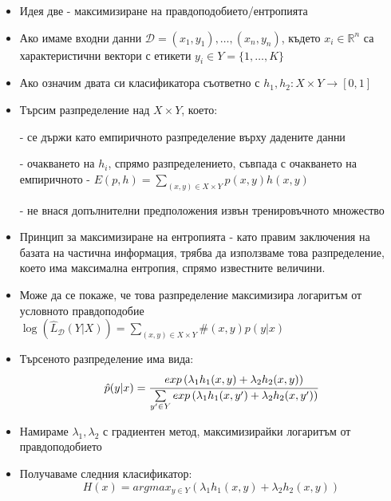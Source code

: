 \documentclass[9pt]{beamer}
\newcommand{\B}[1]{\left(#1\right)}
\begin{document}
    \begin{frame}[t]
        \begin{itemize}
            \setlength\itemsep{\fill}
            \item Идея две
            \pause - максимизиране на правдоподобието/ентропията
            \pause
            \item Ако имаме входни данни $\mathcal{D} = (x_1, y_1),\ldots,(x_n, y_n)$, където $x_i \in \mathbb{R}^n$ са характеристични вектори с етикети $y_i \in Y=\{1,\ldots, K\}$
            \pause
            \item Ако означим двата си класификатора съответно с $h_1, h_2: X\times Y \rightarrow [0, 1]$
            \pause
            \item Търсим разпределение над $X\times Y$, което:
            
            \pause - се държи като емпиричното разпределение върху дадените данни
            
            \pause - очакването на $h_i$, спрямо разпределението, съвпада с очакването на емпиричното
            \pause - $E(p, h) = \sum\limits_{(x, y) \in X\times Y} p(x, y)h(x, y)$

            \pause - не внася допълнителни предположения извън тренировъчното множество
            \pause
            \item Принцип за максимизиране на ентропията
            \pause - като правим заключения на базата на частична информация, трябва да използваме това разпределение, което има максимална ентропия, спрямо известните величини.
        \end{itemize}
    \end{frame}


    \begin{frame}[t]
        \begin{itemize}
            \setlength\itemsep{\fill}
            \item Може да се покаже, че това разпределение максимизира логаритъм от условното правдоподобие
            \pause $\log\B{\widehat{L}_{\mathcal{D}}(Y|X)} = \sum\limits_{(x, y) \in X\times Y} \#(x, y) p(y|x)$
            \pause
            \item Търсеното разпределение има вида:
            \pause
            \[\hat{p}(y|x) = \cfrac{exp\B{\lambda_1 h_1(x, y) + \lambda_2 h_2(x, y)}}{\sum\limits_{y' \in Y} exp\B{\lambda_1 h_1(x, y') + \lambda_2 h_2(x, y')} }\]
            \pause
            \item Намираме $\lambda_1, \lambda_2$ с градиентен метод, максимизирайки логаритъм от правдоподобието
            \pause
            \item Получаваме следния класификатор:
            \pause \[H(x) = argmax_{y\in Y} \B{\lambda_1 h_1(x, y) + \lambda_2 h_2(x, y)}\]
        \end{itemize}
    \end{frame}
\end{document}
